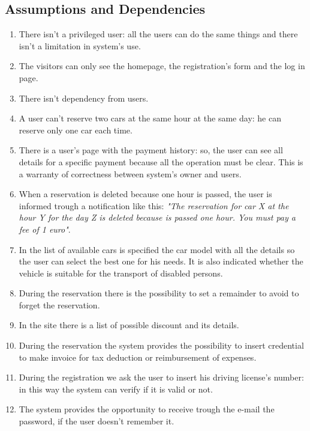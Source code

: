 \subsection{Assumptions and Dependencies} \label{subsec:dependencies}
\begin{enumerate}
\item There isn't a privileged user: all the users can do the same things and there isn't a limitation in system's use.
\item The visitors can only see the homepage, the registration's form and the log in page.
\item There isn't dependency from users.
\item A user can't reserve two cars at the same hour at the same day: he can reserve only one car each time.
\item There is a user's page with the payment history: so, the user can see all details for a specific payment because all the operation must be clear. This is a warranty of correctness between system's owner and users.
\item When a reservation is deleted because one hour is passed, the user is informed trough a notification like this: \emph{"The reservation for car X at the hour Y for the day Z is deleted because is passed one hour. You must pay a fee of 1 euro"}.
\item In the list of available cars is specified the car model with all the details so the user can select the best one for his needs. It is also indicated whether the vehicle is suitable for the transport of disabled persons.
\item During the reservation there is the possibility to set a remainder to avoid to forget the reservation.
\item In the site there is a list of possible discount and its details.
\item During the reservation the system provides the possibility to insert credential to make invoice 
for tax deduction or reimbursement of expenses.
\item During the registration we ask the user to insert his driving license's number: in this way the system can verify if it is valid or not.
\item The system provides the opportunity to receive trough the e-mail the password, if the user doesn't remember it.
\end{enumerate}


